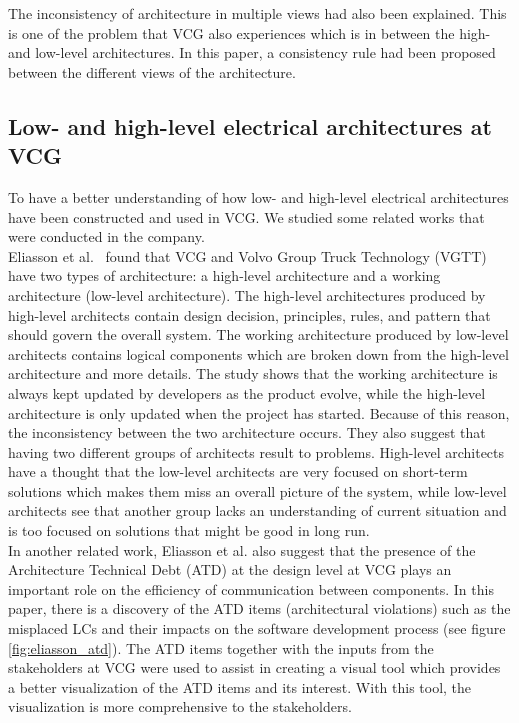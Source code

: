 The inconsistency of architecture in multiple views had also been explained. This is one of the problem that VCG also experiences which is in between the high- and low-level architectures. In this paper, a consistency rule had been proposed between the different views of the architecture.

\subsection{Low- and high-level electrical architectures at VCG}
To have a better understanding of how low- and high-level electrical architectures have been constructed and used in VCG. We studied some related works that were conducted in the company.\\

Eliasson et al.~\cite{Eliasson_1} found that VCG and Volvo Group Truck Technology (VGTT) have two types of architecture: a high-level architecture and a working architecture (low-level architecture). The high-level architectures produced by high-level architects contain design decision, principles, rules, and pattern that should govern the overall system. The working architecture produced by low-level architects contains logical components which are broken down from the high-level architecture and more details. The study shows that the working architecture is always kept updated by developers as the product evolve, while the high-level architecture is only updated when the project has started. Because of this reason, the inconsistency between the two architecture occurs. They also suggest that having two different groups of architects result to problems. High-level architects have a thought that the low-level architects are very focused on short-term solutions which makes them miss an overall picture of the system, while low-level architects see that another group lacks an understanding of current situation and is too focused on solutions that might be good in long run. \\

In another related work, Eliasson et al. \cite{Eliasson_2} also suggest that the presence of the Architecture Technical Debt (ATD) at the design level at VCG plays an important role on the efficiency of communication between components. In this paper, there is a discovery of the ATD items (architectural violations) such as the misplaced LCs and their impacts on the software development process (see figure \ref{fig:eliasson_atd}). The ATD items together with the inputs from the stakeholders at VCG were used to assist in creating a visual tool which provides a better visualization of the ATD items and its interest. With this tool, the visualization is more comprehensive to the stakeholders. 

